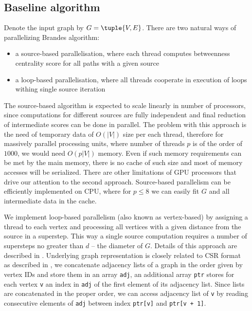 




\subsection*{Baseline algorithm}

Denote the input graph by $G = \tuple{V, E}$.
There are two natural ways of parallelizing Brandes algorithm:
\begin{itemize}
  \item a source-based parallelisation, where each thread computes betweenness centrality score for all paths with a given source
  \item a loop-based parallelisation, where all threads cooperate in execution of loops withing single source iteration
\end{itemize}

The source-based algorithm is expected to scale linearly in number of processors, since computations for different sources are fully independent and final reduction of intermediate scores can be done in parallel.
The problem with this approach is the need of temporary data of $O(|V|)$ size per each thread, therefore for massively parallel processing units, where number of threads $p$ is of the order of $1000$, we would need $O(p |V|)$ memory.
Even if such memory requirements can be met by the main memory, there is no cache of such size and most of memory accesses will be serialized.
There are other limitations of GPU processors that drive our attention to the second approach.
Source-based parallelism can be efficiently implemented on CPU, where for $p \leq 8$ we can easily fit $G$ and all intermediate data in the cache.

We implement loop-based parallelism (also known as vertex-based) by assigning a thread to each vertex and processing all vertices with a given distance from the source in a superstep.
This way a single source computation requires a number of supersteps no greater than $d$ -- the diameter of $G$.
Details of this approach are described in \cite{BcGpu}.
Underlying graph representation is closely related to CSR format as described in \cite{BcGpu}, we concatenate adjacency lists of a graph in the order given by vertex IDs and store them in an array \verb+adj+, an additional array \verb+ptr+ stores for each vertex \verb+v+ an index in \verb+adj+ of the first element of its adjacency list.
Since lists are concatenated in the proper order, we can access adjacency list of \verb+v+ by reading consecutive elements of \verb+adj+ between index \verb+ptr[v]+ and \verb=ptr[v + 1]=.

